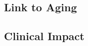 \subsection{Link to Aging}\label{link-to-aging}

\subsection{Clinical Impact}\label{clinical-impact}



